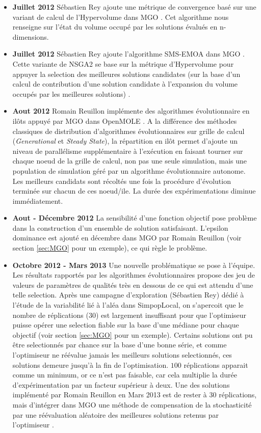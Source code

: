 \begin{itemize}[label=\textbullet]
\item {\textbf{Juillet 2012}} Sébastien Rey ajoute une métrique de convergence basé sur une variant de calcul de l'Hypervolume dans MGO \autocite{Fonseca2006}. Cet algorithme nous renseigne sur l'état du volume occupé par les solutions évalués en n-dimensions. 

\item {\textbf{Juillet 2012}} Sébastien Rey ajoute l'algorithme SMS-EMOA dans MGO \autocite{Emmerich2005}. Cette variante de NSGA2 se base sur la métrique d'Hypervolume pour appuyer la selection des meilleures solutions candidates (sur la base d'un calcul de contribution d'une solution candidate à l'expansion du volume occupés par les meilleures solutions) .

\item {\textbf{Aout 2012}} Romain Reuillon implémente des algorithmes évolutionnaire en ilôts appuyé par MGO dans OpenMOLE \autocite{Whitley1997}. A la différence des méthodes classiques de distribution d'algorithmes évolutionnaires sur grille de calcul (\textit{Generational} et \textit{Steady State}), la répartition en ilôt permet d'ajoute un niveau de parallélisme supplémentaire à l'exécution en faisant tourner sur chaque noeud de la grille de calcul, non pas une seule simulation, mais une population de simulation géré par un algorithme évolutionnaire autonome. Les meilleurs candidats sont récoltés une fois la procédure d'évolution terminée sur chacun de ces noeud/ile. La durée des expérimentations diminue immédiatement.

\item {\textbf{Aout - Décembre 2012}} La sensibilité d'une fonction objectif pose problème dans la construction d'un ensemble de solution satisfaisant. L'epsilon dominance est ajouté en décembre dans MGO par Romain Reuillon (voir section \ref{sec:MGO} pour un exemple), ce qui règle le problème.

\item {\textbf{Octobre 2012 - Mars 2013}} Une nouvelle problématique se pose à l'équipe. Les résultats rapportés par les algorithmes évolutionnaires propose des jeu de valeurs de paramètres de qualités très en dessous de ce qui est attendu d'une telle selection. Après une campagne d'exploration (Sébastien Rey) dédié à l'étude de la variabilité lié à l'aléa dans SimpopLocal, on s'apercoit que le nombre de réplications ($30$) est largement insuffisant pour que l'optimiseur puisse opérer une selection fiable sur la base d'une médiane pour chaque objectif (voir section \ref{sec:MGO} pour un exemple). Certains solutions ont pu être selectionnés par chance sur la base d'une bonne série, et comme l'optimiseur ne réévalue jamais les meilleurs solutions selectionnés, ces solutions demeure jusqu'à la fin de l'optimisation. $100$ réplications apparait comme un minimum, or ce n'est pas faisable, car cela multiplie la durée d'expérimentation par un facteur supérieur à deux. Une des solutions implémenté par Romain Reuillon en Mars 2013 est de rester à $30$ réplications, mais d'intégrer dans MGO une méthode de compensation de la stochasticité par une réévaluation aléatoire des meilleures solutions retenus par l'optimiseur \autocite{Pietro2004}. 


\end{itemize}
